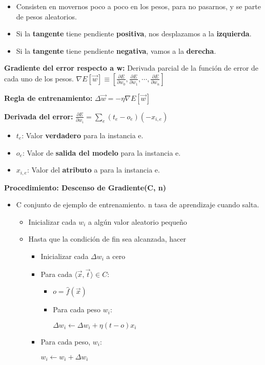 \documentclass[12pt, twoside, openright]{report} %
\begin{document}
\begin{itemize}
	\item Consisten en movernos poco a poco en los pesos, para no pasarnos, y se parte de pesos aleatorios.
	\item Si la \textbf{tangente} tiene pendiente \textbf{positiva}, nos desplazamos a la \textbf{izquierda}.
	\item Si la \textbf{tangente} tiene pendiente \textbf{negativa}, vamos a la \textbf{derecha}.
\end{itemize}

\textbf{Gradiente del error respecto a w:} Derivada parcial de la función de error de cada uno de los pesos. \(\nabla E[\vec{w}] \equiv\left[\frac{\partial E}{\partial w_{0}}, \frac{\partial E}{\partial w_{1}}, \cdots ,\frac{\partial E}{\partial w_{n}}\right]\)

\textbf{Regla de entrenamiento:} \(\Delta \vec{w}=-\eta \nabla E[\vec{w}]\)

\textbf{Derivada del error:} \(\frac{\partial E}{\partial w_{i}}=\sum_{e}\left(t_{e}-o_{e}\right)\left(-x_{i, e}\right)\)

\begin{itemize}
	\item \(t_e\): Valor \textbf{verdadero} para la instancia e.
	\item \(o_e\): Valor de \textbf{salida del modelo} para la instancia e.
	\item \(x_{i,e}\): Valor del \textbf{atributo} a para la instancia e.
\end{itemize}
\pagebreak
\textbf{Procedimiento: Descenso de Gradiente(C, n)}

\begin{itemize}
	\item C conjunto de ejemplo de entrenamiento. n tasa de aprendizaje cuando salta.
		  \begin{itemize}
			  \item Inicializar cada $w_i$ a algún valor aleatorio pequeño
			  \item Hasta que la condición de fin sea alcanzada, hacer
			  \begin{itemize}
				  \item Inicializar cada $\Delta w_i$ a cero
				  \item Para cada $\langle \vec{x}, \vec{t} \rangle \in C $:
				  \begin{itemize}
					  \item $o = \hat{f}(\vec{x})$
				      \item Para cada peso $w_i$:
						
				      $\Delta w_i \leftarrow \Delta w_i + \eta (t - o)x_i$
				  \end{itemize}

				  \item Para cada peso, $w_i$:
                  
				  $w_i \leftarrow w_i + \Delta w_i$
			  \end{itemize}
		  \end{itemize}	  
\end{itemize}
\end{document}
